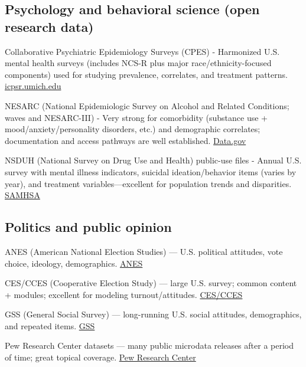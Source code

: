 \documentclass[
  11pt,
]{article}
\begin{document}
\subsection{Psychology and behavioral science (open research
data)}\label{psychology-and-behavioral-science-open-research-data}

Collaborative Psychiatric Epidemiology Surveys (CPES) - Harmonized U.S.
mental health surveys (includes NCS-R plus major race/ethnicity-focused
components) used for studying prevalence, correlates, and treatment
patterns.
\href{https://www.icpsr.umich.edu/web/ICPSR/studies/20240/versions/V3}{icpsr.umich.edu}

NESARC (National Epidemiologic Survey on Alcohol and Related Conditions;
waves and NESARC-III) - Very strong for comorbidity (substance use +
mood/anxiety/personality disorders, etc.) and demographic correlates;
documentation and access pathways are well established.
\href{https://catalog.data.gov/dataset/national-epidemiologic-survey-on-alcohol-and-related-conditions-nesarcwave-1-20012002-and-}{Data.gov}

NSDUH (National Survey on Drug Use and Health) public-use files - Annual
U.S. survey with mental illness indicators, suicidal ideation/behavior
items (varies by year), and treatment variables---excellent for
population trends and disparities.
\href{https://www.samhsa.gov/data/data-we-collect/nsduh-national-survey-drug-use-and-health/datafiles}{SAMHSA}

\subsection{Politics and public
opinion}\label{politics-and-public-opinion}

ANES (American National Election Studies) --- U.S. political attitudes,
vote choice, ideology, demographics.
\href{https://electionstudies.org/data-center/}{ANES}

CES/CCES (Cooperative Election Study) --- large U.S. survey; common
content + modules; excellent for modeling turnout/attitudes.
\href{https://cces.gov.harvard.edu/}{CES/CCES}

GSS (General Social Survey) --- long-running U.S. social attitudes,
demographics, and repeated items.
\href{https://gss.norc.org/get-the-data.html}{GSS}

Pew Research Center datasets --- many public microdata releases after a
period of time; great topical coverage.
\href{https://www.pewresearch.org/download-datasets}{Pew Research
Center}
\end{document}
